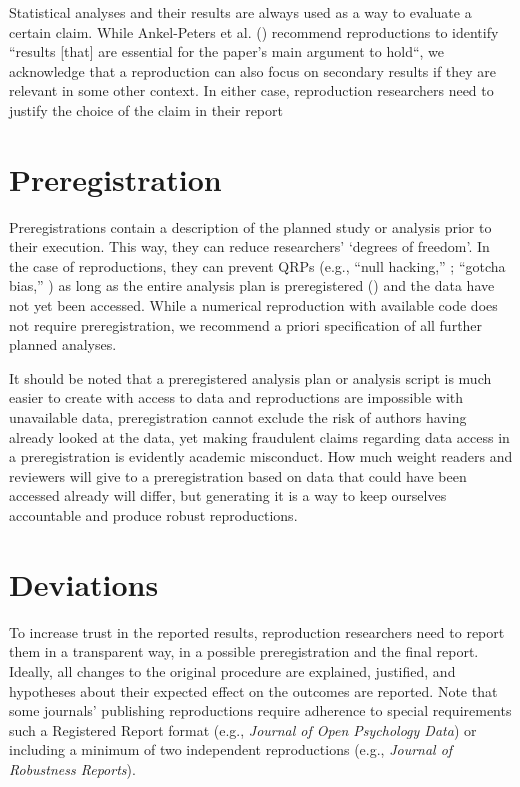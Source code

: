 \documentclass[
  letterpaper,
  DIV=11,
  openany,
  fontsize=12pt,
  parskip=half,
  headings=big,
  numbers=noenddot,
  titlepage=false]{scrreprt}
\begin{document}
Statistical analyses and their results are always used as a way to
evaluate a certain claim. While Ankel-Peters et al.
() recommend reproductions to
identify ``results {[}that{]} are essential for the paper's main
argument to hold``, we acknowledge that a reproduction can also focus on
secondary results if they are relevant in some other context. In either
case, reproduction researchers need to justify the choice of the claim
in their report

\section{Preregistration}\label{preregistration}

Preregistrations contain a description of the planned study or analysis
prior to their execution. This way, they can reduce researchers'
`degrees of freedom'. In the case of reproductions, they can prevent
QRPs (e.g., ``null hacking,'' ; ``gotcha bias,''
)
as long as the entire analysis plan is preregistered
() and the
data have not yet been accessed. While a numerical reproduction with
available code does not require preregistration, we recommend a priori
specification of all further planned analyses.

It should be noted that a preregistered analysis plan or analysis script
is much easier to create with access to data and reproductions are
impossible with unavailable data, preregistration cannot exclude the
risk of authors having already looked at the data, yet making fraudulent
claims regarding data access in a preregistration is evidently academic
misconduct. How much weight readers and reviewers will give to a
preregistration based on data that could have been accessed already will
differ, but generating it is a way to keep ourselves accountable and
produce robust reproductions.

\section{Deviations}\label{deviations}

To increase trust in the reported results, reproduction researchers need
to report them in a transparent way, in a possible preregistration and
the final report. Ideally, all changes to the original procedure are
explained, justified, and hypotheses about their expected effect on the
outcomes are reported. Note that some journals' publishing reproductions
require adherence to special requirements such a Registered Report
format (e.g., \emph{Journal of Open Psychology Data}) or including a
minimum of two independent reproductions (e.g., \emph{Journal of
Robustness Reports}).
\end{document}
